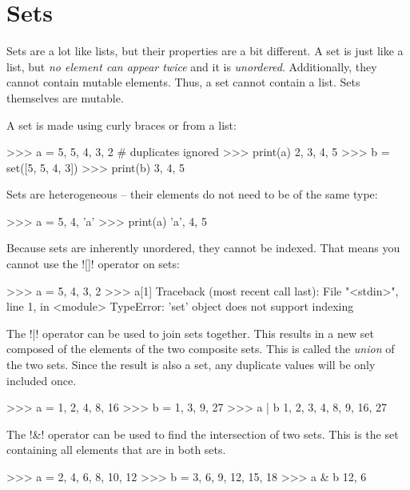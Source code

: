 \documentclass[11pt]{cselabheader}
\begin{document}
\pagebreak

\tableofcontents

\pagebreak

\section{Sets}
Sets are a lot like lists, but their properties are a bit different.
A set is just like a list, but \emph{no element can appear twice} and it is
\emph{unordered}. Additionally, they cannot contain mutable elements. Thus,
a set cannot contain a list. Sets themselves are mutable.

A set is made using curly braces or from a list:
\begin{pyconcode}
>>> a = {5, 5, 4, 3, 2} # duplicates ignored
>>> print(a)
{2, 3, 4, 5}
>>> b = set([5, 5, 4, 3])
>>> print(b)
{3, 4, 5}
\end{pyconcode}

Sets are heterogeneous -- their elements do not need to be of the same type:
\begin{pyconcode}
>>> a = {5, 4, 'a'}
>>> print(a)
{'a', 4, 5}
\end{pyconcode}

Because sets are inherently unordered, they cannot be indexed. That means you
cannot use the \pythoninline![]! operator on sets:
\begin{pyconcode}
>>> a = {5, 4, 3, 2}
>>> a[1]
Traceback (most recent call last):
  File "<stdin>", line 1, in <module>
TypeError: 'set' object does not support indexing
\end{pyconcode}


The \pythoninline!|! operator can be used to join sets together. This results
in a new set composed of the elements of the two composite sets. This is called
the \emph{union} of the two sets. Since the result is also a set, any duplicate
values will be only included once.
\begin{pyconcode}
>>> a = {1, 2, 4, 8, 16}
>>> b = {1, 3, 9, 27}
>>> a | b
{1, 2, 3, 4, 8, 9, 16, 27}
\end{pyconcode}

The \pythoninline!&! operator can be used to find the intersection of two sets.
This is the set containing all elements that are in both sets.
\begin{pyconcode}
>>> a = {2, 4, 6, 8, 10, 12}
>>> b = {3, 6, 9, 12, 15, 18}
>>> a & b
{12, 6}
\end{pyconcode}
\end{document}
